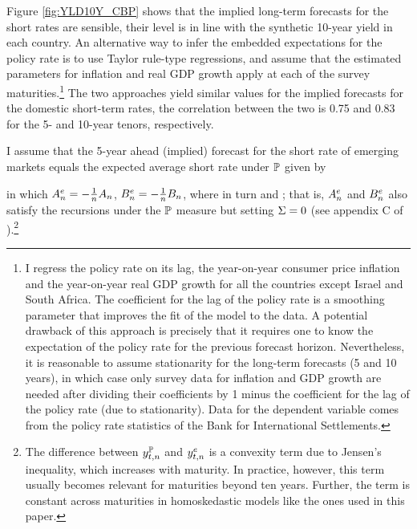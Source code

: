 {Figure \ref{fig:YLD10Y_CBP} shows that the implied long-term forecasts for the short rates are sensible, their level is in line with the synthetic 10-year yield in each country.
An alternative way to infer the embedded expectations for the policy rate is to use Taylor rule-type regressions, and assume that the estimated parameters for inflation and real GDP growth apply at each of the survey maturities.\footnote{ I regress the policy rate on its lag, the year-on-year consumer price inflation and the year-on-year real GDP growth for all the countries except Israel and South Africa. The coefficient for the lag of the policy rate is a smoothing parameter that improves the fit of the model to the data. A potential drawback of this approach is precisely that it requires one to know the expectation of the policy rate for the previous forecast horizon. Nevertheless, it is reasonable to assume stationarity for the long-term forecasts (5 and 10 years), in which case only survey data for inflation and GDP growth are needed after dividing their coefficients by 1 minus the coefficient for the lag of the policy rate (due to stationarity). Data for the dependent variable comes from the policy rate statistics of the Bank for International Settlements.}
The two approaches yield similar values for the implied forecasts for the domestic short-term rates, the correlation  between the two is 0.75 and 0.83 for the 5- and 10-year tenors, respectively.

I assume that the 5-year ahead (implied) forecast for the short rate of emerging markets equals the expected average short rate under \(\mathbb{P}\) given by

\noindent in which \(A_{n}^{e} = - \frac{1}{n} A_{n}\), \(B_{n}^{e} = - \frac{1}{n} B_{n}\), where in turn  and ; that is, \(A_{n}^{e}\) and \(B_{n}^{e}\) also satisfy the recursions under the \(\mathbb{P}\) measure but setting \(\Sigma = 0\) (see appendix C of \cite{Guimaraes:2014}).\footnote{ The difference between \(y_{t,n}^{\mathbb{P}}\) and \(y_{t,n}^{e}\) is a convexity term due to Jensen's inequality, which increases with maturity. In practice, however, this term usually becomes relevant for maturities beyond ten years. Further, the term is constant across maturities in homoskedastic models like the ones used in this paper.}

}
